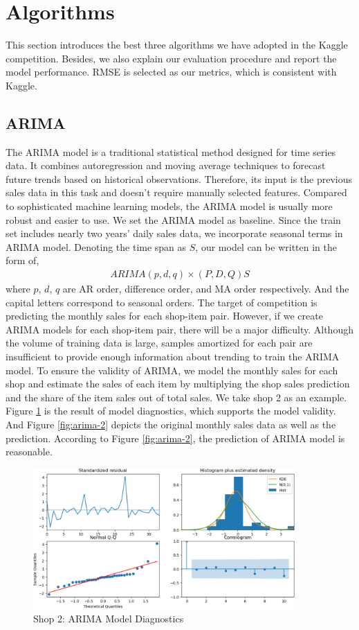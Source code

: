 \documentclass{article}
\begin{document}
\section{Algorithms}
This section introduces the best three algorithms we have adopted in the Kaggle competition. Besides, we also explain our evaluation procedure and report the model performance. RMSE is selected as our metrics, which is consistent with Kaggle. 

\subsection{ARIMA}
The ARIMA model is a traditional statistical method designed for time series data. It combines autoregression and moving average techniques to forecast future trends based on historical observations. Therefore, its input is the previous sales data in this task and doesn't require manually selected features. Compared to sophisticated machine learning models, the ARIMA model is usually more robust and easier to use. We set the ARIMA model as baseline. Since the train set includes nearly two years' daily sales data, we incorporate seasonal terms in ARIMA model. Denoting the time span as $S$, our model can be written in the form of,
\begin{align*}
    ARIMA\left( p, d, q \right) \times\left( P, D, Q \right) S
\end{align*}
where $p$, $d$, $q$ are AR order, difference order, and MA order respectively. And the capital letters correspond to seasonal orders. The target of competition is predicting the monthly sales for each shop-item pair. However, if we create ARIMA models for each shop-item pair, there will be a major difficulty. Although the volume of training data is large, samples amortized for each pair are insufficient to provide enough information about trending to train the ARIMA model. To ensure the validity of ARIMA, we model the monthly sales for each shop and estimate the sales of each item by multiplying the shop sales prediction and the share of the item sales out of total sales. We take shop 2 as an example. Figure \ref{fig:arima-1} is the result of model diagnostics, which supports the model validity. And Figure \ref{fig:arima-2} depicts the original monthly sales data as well as the prediction. According to Figure \ref{fig:arima-2}, the prediction of ARIMA model is reasonable.\par

\begin{figure}[!ht]
    \centering
    \includegraphics[width=10cm]{./figs/arima-1.png}
    \caption{Shop 2: ARIMA Model Diagnostics}
    \label{fig:arima-1}
\end{figure}
\end{document}
